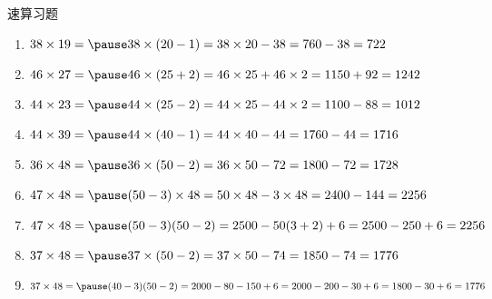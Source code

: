 \documentclass[aspectratio=169]{ctexbeamer} %
\begin{document}
\begin{frame}[t]{速算习题}
\begin{spacing}{1.2}
\normalsize
\begin{enumerate}[label={\arabic*.}]
\item $ 38 \times 19 = \pause 38 \times (20-1) = 38 \times 20 - 38 = 760 - 38 = 722$
\item $ 46 \times 27 = \pause 46 \times (25+2) = 46 \times 25 + 46 \times 2 = 1150 + 92 = 1242$
\item $ 44 \times 23 = \pause 44 \times (25-2) = 44 \times 25 - 44 \times 2 = 1100 - 88 = 1012$
\item $ 44 \times 39 = \pause 44 \times (40-1) = 44 \times 40 - 44 = 1760 -44 = 1716$
\item $ 36 \times 48 = \pause 36 \times (50-2) = 36 \times 50 - 72 = 1800 - 72 = 1728$
\item $ 47 \times 48 = \pause (50-3) \times 48 = 50 \times 48 - 3 \times 48 = 2400 - 144 = 2256$
\item $ 47 \times 48 = \pause (50-3)(50-2) = 2500 - 50(3+2) + 6 = 2500 - 250 + 6 = 2256$
\item $ 37 \times 48 = \pause 37 \times (50-2) = 37 \times 50 - 74 = 1850 - 74 = 1776$
\item $ 37 \times 48 = \pause (40-3)(50-2) = 2000 - 80 - 150 + 6 = 2000 - 200 - 30 + 6 = 1800 - 30 + 6 = 1776$
\end{enumerate}

\end{spacing}
\end{frame}
\end{document}
